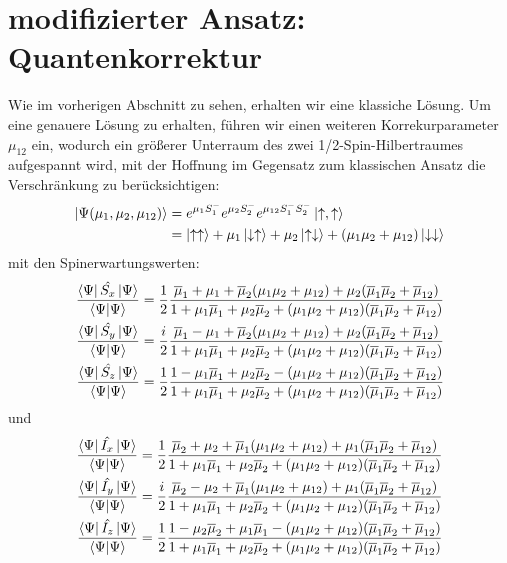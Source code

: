 \section{modifizierter Ansatz: Quantenkorrektur}
\noindent Wie im vorherigen Abschnitt zu sehen, erhalten wir eine klassiche Lösung. Um eine genauere Lösung zu erhalten, 
führen wir einen weiteren Korrekurparameter $\mu_{12}$ ein, wodurch ein größerer Unterraum des zwei 1/2-Spin-Hilbertraumes aufgespannt 
wird, mit der Hoffnung im Gegensatz zum klassischen Ansatz die Verschränkung zu berücksichtigen:
\begin{align}
    \ket{\Psi(\mu_1,\mu_2,\mu_{12})} &= e^{\mu_1 S_1^-}e^{\mu_2 S_2^-}e^{\mu_{12} S_1^-S_2^-}\ket{\uparrow,\uparrow}\\
                                    &= \ket{\uparrow \uparrow} +\mu_1\ket{\downarrow \uparrow} + \mu_2\ket{\uparrow \downarrow} + (\mu_1\mu_2 + \mu_{12})\ket{\downarrow \downarrow}
\end{align}
mit den Spinerwartungswerten:
\begin{align}
    \frac{\bra{\Psi}\hat{S_x}\ket{\Psi}}{\bra{\Psi}\ket{\Psi}} &= \frac{1}{2}\frac{\overline{\mu}_1 + \mu_1 + \overline{\mu}_2(\mu_1\mu_2 + \mu_{12}) + \mu_2(\overline{\mu}_1\overline{\mu}_2 + \overline{\mu}_{12})}{1+\mu_1\overline{\mu}_1 + \mu_2\overline{\mu}_2 + (\mu_1\mu_2 + \mu_{12})(\overline{\mu}_1\overline{\mu}_2 + \overline{\mu}_{12})} \\
    \frac{\bra{\Psi}\hat{S_y}\ket{\Psi}}{\bra{\Psi}\ket{\Psi}} &= \frac{i}{2}\frac{\overline{\mu}_1 - \mu_1 + \overline{\mu}_2(\mu_1\mu_2 + \mu_{12}) + \mu_2(\overline{\mu}_1\overline{\mu}_2 + \overline{\mu}_{12})}{1+\mu_1\overline{\mu}_1 + \mu_2\overline{\mu}_2 + (\mu_1\mu_2 + \mu_{12})(\overline{\mu}_1\overline{\mu}_2 + \overline{\mu}_{12})}\\
    \frac{\bra{\Psi}\hat{S_z}\ket{\Psi}}{\bra{\Psi}\ket{\Psi}} &= \frac{1}{2}\frac{1 - \mu_1\overline{\mu}_1 + \mu_2\overline{\mu}_2 - (\mu_1\mu_2 + \mu_{12})(\overline{\mu}_1\overline{\mu}_2 + \overline{\mu}_{12})}{1 + \mu_1\overline{\mu}_1 + \mu_2\overline{\mu}_2 + (\mu_1\mu_2 + \mu_{12})(\overline{\mu}_1\overline{\mu}_2 + \overline{\mu}_{12})}  
\end{align}
und
\begin{align}
    \frac{\bra{\Psi}\hat{I_x}\ket{\Psi}}{\bra{\Psi}\ket{\Psi}} &= \frac{1}{2}\frac{\overline{\mu}_2 + \mu_2 + \overline{\mu}_1(\mu_1\mu_2 + \mu_{12}) + \mu_1(\overline{\mu}_1\overline{\mu}_2 + \overline{\mu}_{12})}{1+\mu_1\overline{\mu}_1 + \mu_2\overline{\mu}_2 + (\mu_1\mu_2 + \mu_{12})(\overline{\mu}_1\overline{\mu}_2 + \overline{\mu}_{12})} \\
    \frac{\bra{\Psi}\hat{I_y}\ket{\Psi}}{\bra{\Psi}\ket{\Psi}} &= \frac{i}{2}\frac{\overline{\mu}_2 - \mu_2 + \overline{\mu}_1(\mu_1\mu_2 + \mu_{12}) + \mu_1(\overline{\mu}_1\overline{\mu}_2 + \overline{\mu}_{12})}{1+\mu_1\overline{\mu}_1 + \mu_2\overline{\mu}_2 + (\mu_1\mu_2 + \mu_{12})(\overline{\mu}_1\overline{\mu}_2 + \overline{\mu}_{12})}\\
    \frac{\bra{\Psi}\hat{I_z}\ket{\Psi}}{\bra{\Psi}\ket{\Psi}} &= \frac{1}{2}\frac{1 - \mu_2\overline{\mu}_2 + \mu_1\overline{\mu}_1 - (\mu_1\mu_2 + \mu_{12})(\overline{\mu}_1\overline{\mu}_2 + \overline{\mu}_{12})}{1 + \mu_1\overline{\mu}_1 + \mu_2\overline{\mu}_2 + (\mu_1\mu_2 + \mu_{12})(\overline{\mu}_1\overline{\mu}_2 + \overline{\mu}_{12})}  
\end{align}
